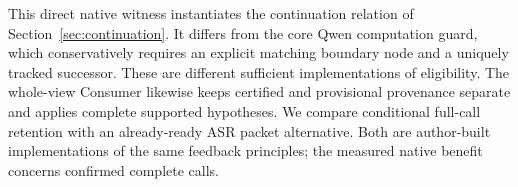 This direct native witness instantiates the continuation relation of
Section~\ref{sec:continuation}. It differs from the core Qwen computation
guard, which conservatively requires an explicit matching boundary node and
a uniquely tracked successor. These are different sufficient implementations
of eligibility. The whole-view Consumer likewise keeps certified and
provisional provenance separate and applies complete supported hypotheses.
We compare conditional full-call retention with an already-ready ASR packet
alternative. Both are author-built implementations of the same feedback
principles; the measured native benefit concerns confirmed complete calls.
